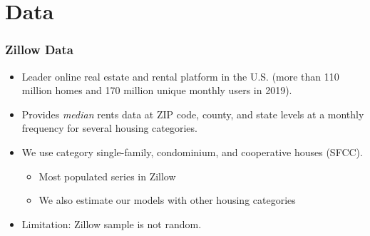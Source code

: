 \documentclass[aspectratio=169, t]{beamer}
\begin{document}
\section{Data}

\begin{frame}[label = zillow_data]
    \frametitle{Zillow Data}
    
    \begin{itemize}
        \item Leader online real estate and rental platform in the U.S. {\small (more 
        than 110 million homes and 170 million unique monthly users in 2019).}
        
        \vspace{2mm} \item
        Provides \textit{median} rents data at ZIP code, county, and state levels 
        at a monthly frequency for several housing categories.
        
        \pause
        \vspace{2mm} \item
        We use category single-family, condominium, and cooperative houses (SFCC).
        \begin{itemize}
            \item Most populated series in Zillow
            \item We also estimate our models with other housing categories
        \end{itemize}
        
        \vspace{2mm} \item
        Limitation: Zillow sample is not random.

        \hyperlink{zillow_pop_density}{}

    \end{itemize}
\end{frame}
\end{document}
